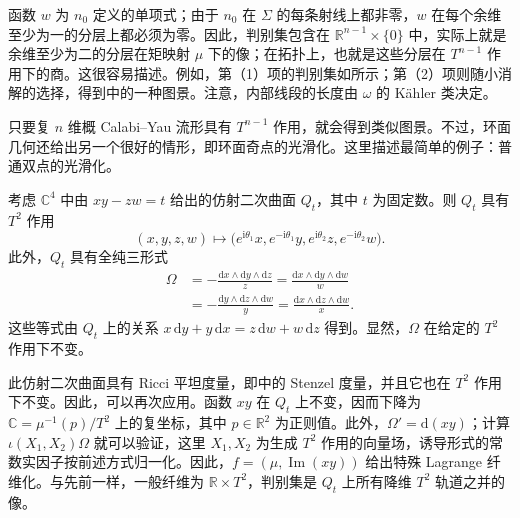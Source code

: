 函数 $w$ 为 $n_0$ 定义的单项式；由于 $n_0$ 在 $\Sigma$ 的每条射线上都非零，$w$ 在每个余维至少为一的分层上都必须为零。因此，判别集包含在 $\mathbb R^{n-1}\times\{0\}$ 中，实际上就是余维至少为二的分层在矩映射 $\mu$ 下的像；在拓扑上，也就是这些分层在 $T^{n-1}$ 作用下的商。这很容易描述。例如，第（1）项的判别集如所示；第（2）项则随小消解的选择，得到中的一种图景。注意，内部线段的长度由 $\omega$ 的 Kähler 类决定。
\begin{figure}[H]
\centering
{}
\BookNumberOnlyCaption\label{fig:7.4}
\end{figure}
\begin{figure}[H]
\centering
{}
\BookNumberOnlyCaption\label{fig:7.5}
\end{figure}

只要复 $n$ 维概 Calabi--Yau 流形具有 $T^{n-1}$ 作用，就会得到类似图景。不过，环面几何还给出另一个很好的情形，即环面奇点的光滑化。这里描述最简单的例子：普通双点的光滑化。

考虑 $\mathbb C^4$ 中由 $xy-zw=t$ 给出的仿射二次曲面 $Q_t$，其中 $t$ 为固定数。则 $Q_t$ 具有 $T^2$ 作用
\[
(x,y,z,w)\longmapsto
\bigl(e^{\mathrm i\theta_1}x,e^{-\mathrm i\theta_1}y,
e^{\mathrm i\theta_2}z,e^{-\mathrm i\theta_2}w\bigr).
\]
此外，$Q_t$ 具有全纯三形式
\[
\begin{aligned}
\Omega
&=-\frac{\mathrm dx\wedge\mathrm dy\wedge\mathrm dz}{z}
=\frac{\mathrm dx\wedge\mathrm dy\wedge\mathrm dw}{w}\\
&=-\frac{\mathrm dy\wedge\mathrm dz\wedge\mathrm dw}{y}
=\frac{\mathrm dx\wedge\mathrm dz\wedge\mathrm dw}{x}.
\end{aligned}
\]
这些等式由 $Q_t$ 上的关系 $x\,\mathrm dy+y\,\mathrm dx=z\,\mathrm dw+w\,\mathrm dz$ 得到。显然，$\Omega$ 在给定的 $T^2$ 作用下不变。

此仿射二次曲面具有 Ricci 平坦度量，即中的 Stenzel 度量，并且它也在 $T^2$ 作用下不变。因此，可以再次应用。函数 $xy$ 在 $Q_t$ 上不变，因而下降为 $\mathbb C=\mu^{-1}(p)/T^2$ 上的复坐标，其中 $p\in\mathbb R^2$ 为正则值。此外，$\Omega'=\mathrm d(xy)$；计算 $\iota(X_1,X_2)\Omega$ 就可以验证，这里 $X_1,X_2$ 为生成 $T^2$ 作用的向量场，诱导形式的常数实因子按前述方式归一化。因此，$f=(\mu,\operatorname{Im}(xy))$ 给出特殊 Lagrange 纤维化。与先前一样，一般纤维为 $\mathbb R\times T^2$，判别集是 $Q_t$ 上所有降维 $T^2$ 轨道之并的像。

